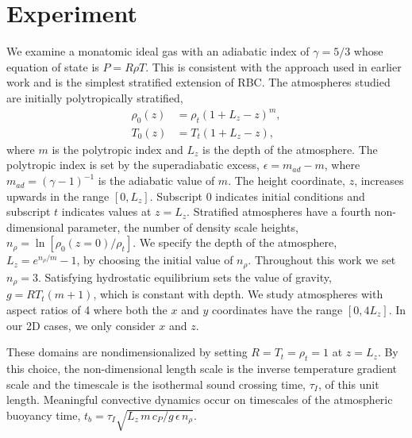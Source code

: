 \documentclass[aps, prfluids, onecolumn, notitlepage, nofootinbib, groupedaddress, amsfonts, amssymb, amsmath]{revtex4-1}
\begin{document}
\section{Experiment} 
\label{sec:experiment}
We examine a monatomic ideal gas with an adiabatic index of
$\gamma = 5/3$ whose equation of state is $P = R\rho T$. This is consistent with the approach used in earlier work 
\cite{graham1975, chan&all1982, brandenburg&all2005,
hurlburt&all1984, cattaneo&all1990, cattaneo&all1991, brummell&all1996} 
and is the simplest stratified extension of RBC.
The atmospheres studied are initially polytropically stratified,
\begin{equation}
\begin{split}
\rho_0(z) &= \rho_{t}(1 + L_z - z)^m, \\
T_0(z)    &= T_{t}(1 + L_z - z),
\label{eqn:polytrope}
\end{split}
\end{equation}
where $m$ is the polytropic index and $L_z$ is the depth of the atmosphere.
The polytropic
index is set by the superadiabatic excess, $\epsilon = m_{ad} - m$, where
$m_{ad} = (\gamma - 1)^{-1}$ is the adiabatic value of $m$.
The height coordinate, $z$, increases upwards in the range $[0, L_z]$.
Subscript 0 indicates initial conditions and subscript $t$ indicates values
at $z = L_z$.   Stratified atmospheres have a fourth non-dimensional parameter,
the number of density scale heights, $n_{\rho} = \ln\left[\rho_0(z=0)/\rho_t\right]$.  We
specify the depth of the atmosphere, $L_z = e^{n_{\rho}/m} - 1$, by choosing
the initial value of $n_{\rho}$.
Throughout this work we set $n_{\rho} = 3$.    Satisfying hydrostatic
equilibrium sets the value of gravity, $g = RT_t (m + 1)$, which is
constant with depth.  We study atmospheres with aspect
ratios of 4 where both the $x$ and $y$ coordinates have the range $[0, 4L_z]$.
In our 2D cases, we only consider $x$ and $z$.

These domains are nondimensionalized by setting
$R = T_t = \rho_t = 1$ at $z = L_z$.
By this choice, the non-dimensional
length scale is the inverse temperature gradient scale and the 
timescale is the isothermal sound crossing time, 
$\tau_I$, of this unit length.
Meaningful convective dynamics occur on 
timescales of the atmospheric buoyancy time,
$t_b = \tau_I \sqrt{L_z\,m\,c_P/g\,\epsilon\,n_\rho}$. 
\end{document}
